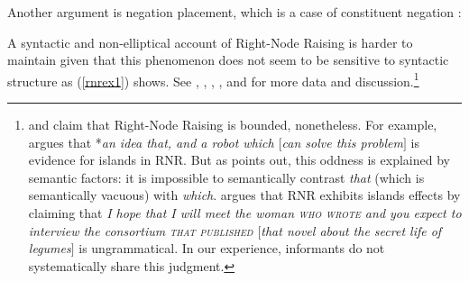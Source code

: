 \documentclass[output=paper]{langsci/langscibook}
\begin{document}
\begin{exe}
\ex 
\begin{xlista}


\end{xlista}
\end{exe}

\noindent
Another argument is negation placement, which is a case of constituent negation
\citep[253]{Mouret:06}: 

\begin{exe}
 \ex 
 \begin{xlista}
\end{xlista}
\end{exe}


A syntactic and non-elliptical account of Right-Node Raising is harder to maintain given that this phenomenon does not seem to be sensitive to  syntactic structure as (\ref{rnrex1}) shows. See 
\citet{bresnan74},
 \citet[299]{wexlercull},  \citet[45]{grosu81},
 \citet{
mccawley},  and \citet[382,footnote 30]{sab}
for more data and discussion.\footnote{\citet{
steedman85,gapsteed,steedmanbook}
and \citet[183]{dowty88} claim that
Right-Node Raising is bounded, nonetheless.
For example, \citet{
dowty88} argues that  *\emph{an idea that, and a robot which $[$can solve this problem$]$} is  evidence for islands in RNR. But as \citet[95]{phil}
 points out, this oddness is explained by semantic factors: it is impossible to   semantically contrast \emph{that} (which is semantically vacuous) with \emph{which}.
 \citet[17]{steedmanbook}   argues that RNR
exhibits islands effects by claiming that \emph{I hope that I will meet the woman
\textsc{who wrote} and you expect to interview the
consortium \textsc{that published} $[$that
novel about the secret life of legumes$]$} is ungrammatical.
In our experience, informants do not systematically share this judgment.}
\end{document}
